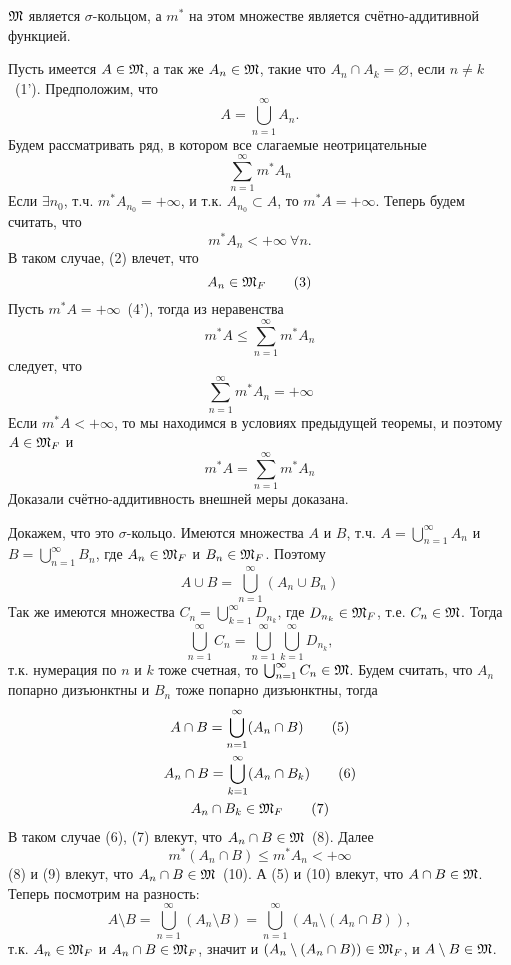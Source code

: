 \documentclass[main]{subfiles}
\begin{document}
\begin{theorem}
    $\mathfrak{M}$ является $\sigma$-кольцом, а $m^*$ на этом множестве является счётно-аддитивной функцией.
\end{theorem}
\begin{longProof}
    Пусть имеется $A \in \mathfrak{M}$, а так же $A_n \in \mathfrak{M}$, такие что $A_n \cap A_k = \varnothing$, если $n \neq k$~(1').
    Предположим, что
    \[A = \bigcup_{n=1}^\infty A_n. \tag{1}\]
    Будем рассматривать ряд, в котором все слагаемые неотрицательные
    \[\sum_{n=1}^{\infty} m^* A_n\]
    Если $\exists n_0$, т.ч. $m^* A_{n_0} = +\infty$, и т.к. $A_{n_0} \subset A$, то $m^* A = +\infty$.
    Теперь будем считать, что
    \[m^* A_n < +\infty\ \forall n. \tag{2}\]
    В таком случае, (2) влечет, что
    \[A_n \in \mathfrak{M}_F \tag{3}\]
    Пусть $m^* A = +\infty$~(4'), тогда из неравенства
    \[m^* A \le \sum_{n=1}^{\infty} m^* A_n\]
    следует, что
    \[\sum_{n=1}^{\infty} m^* A_n = +\infty \tag{4}\]
    Если $m^* A < +\infty$, то мы находимся в условиях предыдущей теоремы, и поэтому $A \in \mathfrak{M}_F$ и
    \[m^* A = \sum_{n=1}^{\infty} m^* A_n\]
    Доказали счётно-аддитивность внешней меры доказана.

    Докажем, что это $\sigma$-кольцо.
    Имеются множества $A$ и $B$, т.ч. $A = \bigcup_{n=1}^\infty A_n$ и $B = \bigcup_{n=1}^\infty B_n$, где $A_n \in \mathfrak{M}_F$ и $B_n \in \mathfrak{M}_F$.
    Поэтому
    \[A \cup B = \bigcup_{n=1}^\infty (A_n \cup B_n)\]
    Так же имеются множества $C_n = \bigcup_{k=1}^\infty D_{n_k}$, где $D_{n_k} \in \mathfrak{M}_F$, т.е. $C_n \in \mathfrak{M}$.
    Тогда
    \[\bigcup_{n=1}^\infty C_n = \bigcup_{n=1}^\infty \bigcup_{k=1}^\infty D_{n_k},\]
    т.к. нумерация по $n$ и $k$ тоже счетная, то $\bigcup_{n=1}^\infty C_n \in \mathfrak{M}$.
    Будем считать, что $A_n$ попарно дизъюнктны и $B_n$ тоже попарно дизъюнктны, тогда
    \begin{gather*}
        A \cap B = \bigcup_{n=1}^\infty (A_n \cap B) \tag{5} \\
        A_n \cap B = \bigcup_{k=1}^\infty (A_n \cap B_k) \tag{6} \\
        A_n \cap B_k \in \mathfrak{M}_F \tag{7}
    \end{gather*}
    В таком случае (6), (7) влекут, что $A_n \cap B \in \mathfrak{M}$~(8).
    Далее
    \[m^* (A_n \cap B) \le m^* A_n < +\infty \tag{9}\]
    (8) и (9) влекут, что $A_n \cap B \in \mathfrak{M}$~(10).
    А (5) и (10) влекут, что $A \cap B \in \mathfrak{M}$.
    Теперь посмотрим на разность:
    \[A \setminus B = \bigcup_{n=1}^\infty (A_n \setminus B) = \bigcup_{n=1}^\infty (A_n \setminus (A_n \cap B)),\]
    т.к. $A_n \in \mathfrak{M}_F$ и $A_n \cap B \in \mathfrak{M}_F$, значит и $(A_n \setminus (A_n \cap B)) \in \mathfrak{M}_F$, и $A \setminus B \in \mathfrak{M}$.
\end{longProof}
\end{document}
